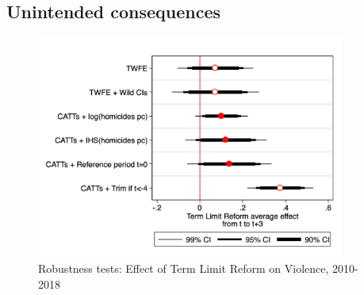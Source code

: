\begin{appendix}
     

   
   
      
   
%   

   
%   

              
   
%   
 
   
%   
  
    
% 
  
     
%   
    
 \clearpage   
      
 \subsection{Unintended consequences }
%   
           
 

      
   
     \begin{figure}[H]   
\centering
 \caption{Robustness tests: Effect of Term Limit Reform on Violence, 2010-2018}
 \label{fig:robustness_violence}
\includegraphics[width=0.9\textwidth]{Figures/average_effects_homicides.png}
       \captionsetup{justification=centering}
       

\end{figure}
\end{appendix}
